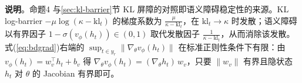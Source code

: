 \documentclass[lettersize,journal]{IEEEtran}
\begin{document}
\textbf{说明}。命题4 与\ref{sec:kl-barrier}节 KL 屏障的对照即语义障碍稳定性的来源。KL log-barrier $-\mu\log(\kappa - \mathrm{kl}_t)$ 的梯度系数为 $\frac{\mu}{\kappa - \mathrm{kl}_t}$，在 $\mathrm{kl}_t \to \kappa$ 时发散；语义障碍以有界因子 $1-\sigma(v_\phi(h_t)) \in (0,1)$ 取代发散因子 $\frac{1}{\kappa - \mathrm{kl}_t}$，从而消除该发散。式(\ref{eq:bdgrad})右端的 $\sup_{t \in y_r}\|\nabla_\theta v_\phi(h_t)\|$ 在标准正则性条件下有限：由 $v_\phi(h_t) = w_v^\top h_t + b_v$ 得 $\nabla_\theta v_\phi(h_t) = (\nabla_\theta h_t)\,w_v$，只要 $\|w_v\|$ 有界且隐状态 $h_t$ 对 $\theta$ 的 Jacobian 有界即可。














\vfill
\end{document}
